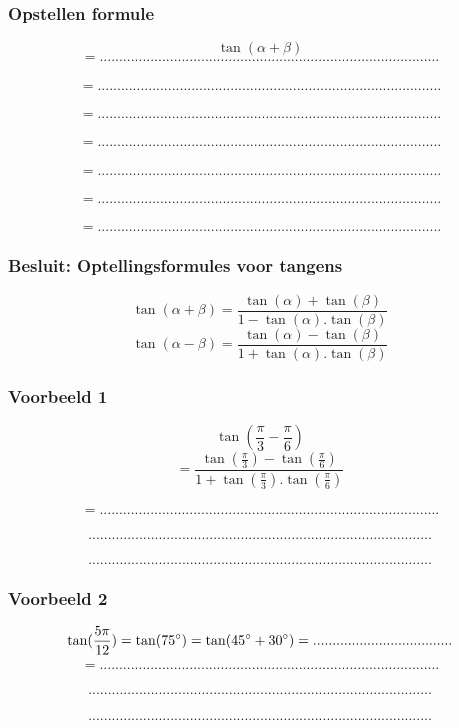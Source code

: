 \documentclass[a4paper,12pt]{article}
\begin{document}
\subsubsection{Opstellen formule}
\[\tan(\alpha + \beta)
\]
\[=.......................................................................................\]
\subparagraph{}
\[=........................................................................................\]
\subparagraph{}
\[=........................................................................................\]
\subparagraph{}
\[=........................................................................................\]
\subparagraph{}
\[=........................................................................................\]\subparagraph{}
\[=........................................................................................\]
\subparagraph{}
\[=........................................................................................\]
\subsubsection{Besluit: Optellingsformules voor tangens}
\textbf{\[\tan(\alpha + \beta)=\frac{\tan(\alpha)+\tan(\beta)}{1-\tan(\alpha).\tan(\beta)}
\]
\[\tan(\alpha - \beta)=\frac{\tan(\alpha)-\tan(\beta)}{1+\tan(\alpha).\tan(\beta)}
\]}
\subsubsection{Voorbeeld 1}

\[\tan(\frac{\pi}{3} - \frac{\pi}{6})
\]
\[=\frac{\tan(\frac{\pi}{3})-\tan(\frac{\pi}{6})}{1+\tan(\frac{\pi}{3}).\tan(\frac{\pi}{6})}\]
\paragraph{}
\[=.......................................................................................\]
\subparagraph{}
\[........................................................................................\]
\subparagraph{}
\[........................................................................................\]

\subsubsection{Voorbeeld 2}
\[\tan(\frac{5\pi}{12})=\tan(75^\circ)=\tan(45^\circ+30^\circ)=....................................
\]
\[=.......................................................................................\]
\subparagraph{}
\[........................................................................................\]
\subparagraph{}
\[........................................................................................\]
\end{document}

